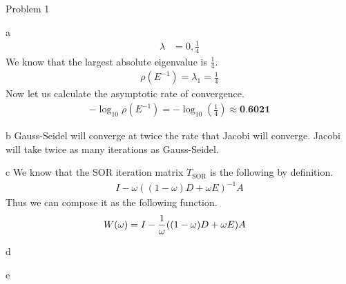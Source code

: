 \begin{section}{Problem 1}
\begin{solution}{a}
\begin{align*}
            \lambda &= 0, \frac{1}{4}
        \end{align*}
        We know that the largest absolute eigenvalue is $\frac{1}{4}$.
        \begin{align*}
            \rho \left( E^{-1} \right) = \lambda_1 = \frac{1}{4}
        \end{align*}
        Now let us calculate the asymptotic rate of convergence.
        \begin{align*}
            - \log_{10} \rho \left( E^{-1} \right) = - \log_{10} \left( \frac{1}{4} \right) \approx \textbf{0.6021}
        \end{align*}
    \end{solution}

    \newpage

    \begin{solution}{b}
        Gauss-Seidel will converge at twice the rate that Jacobi will converge. Jacobi will take twice as many iterations as Gauss-Seidel.
    \end{solution}

    \newpage

    \begin{solution}{c}
        We know that the SOR iteration matrix $T_\text{SOR}$ is the following by definition.
        \begin{align*}
            I - \omega ((1 - \omega)D + \omega E)^{-1} A
        \end{align*}
        Thus we can compose it as the following function.
        \begin{align*}
            \boldmath{W}(\omega) &= I - \frac{1}{\omega} ((1 - \omega)D + \omega E) A
        \end{align*}
    \end{solution}

    \newpage

    \begin{solution}{d}
    \end{solution}

    \newpage 

    \begin{solution}{e}
    \end{solution}

\end{section}